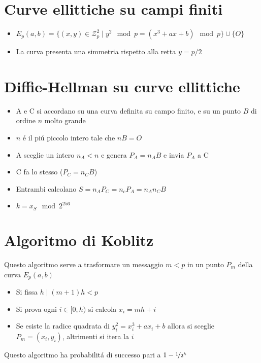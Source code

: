 \section{Curve ellittiche su campi finiti}

\begin{itemize}
    \item $E_p(a, b) = \{(x, y) \in \mathcal{Z}_p^2 \mid y^2 \mod{p} = (x^3 + ax + b) \mod{p}\} \cup \{O\}$
    \item La curva presenta una simmetria rispetto alla retta $y = p/2$
\end{itemize}

\section{Diffie-Hellman su curve ellittiche}

\begin{itemize}
    \item A e C si accordano su una curva definita su campo finito, e su un punto $B$ di ordine $n$ molto grande
    \item $n$ \'e il pi\'u piccolo intero tale che $nB = O$
    \item A sceglie un intero $n_A < n$ e genera $P_A = n_AB$ e invia $P_A$ a C
    \item C fa lo stesso ($P_C = n_CB$)
    \item Entrambi calcolano $S = n_AP_C = n_cP_A = n_An_CB$
    \item $k = x_S \mod{2^{256}}$
\end{itemize}

\section{Algoritmo di Koblitz}

Questo algoritmo serve a trasformare un messaggio $m < p$ in un punto $P_m$ della curva $E_p(a, b)$
\begin{itemize}
    \item Si fissa $h \mid (m+1)h < p$
    \item Si prova ogni $i \in [0, h)$ si calcola $x_i = mh + i$
    \item Se esiste la radice quadrata di $y_i^2 = x_i^3 + ax_i + b$ allora si sceglie $P_m = (x_i, y_i)$, altrimenti si itera la $i$
\end{itemize}

Questo algoritmo ha probabilit\'a di successo pari a $1-\nicefrac{1}{2^h}$

